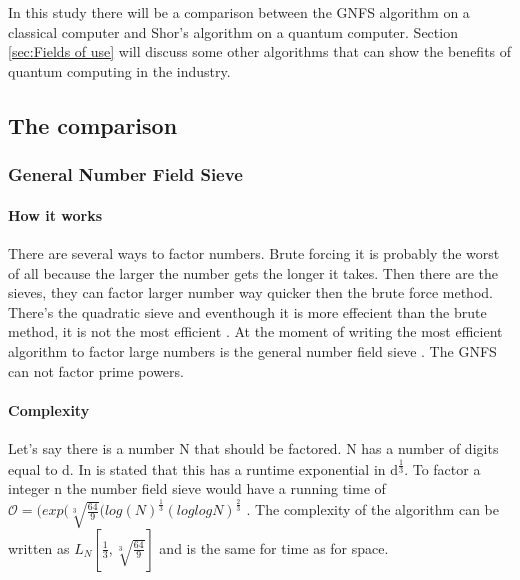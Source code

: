 
\chapter{}
\label{ch:onderzoek}



In this study there will be a comparison between the GNFS algorithm on a classical computer and Shor's algorithm on a quantum computer.
Section \ref{sec:Fields of use} will discuss some other algorithms that can show the benefits of quantum computing in the industry.
\section{The comparison}
\subsection{General Number Field Sieve}
\subsubsection{How it works}
There are several ways to factor numbers. Brute forcing it is probably the worst of all because the larger the number gets the longer it takes. Then there are the sieves, they can factor larger number way quicker then the brute force method.
There's the quadratic sieve and eventhough it is more effecient than the brute method, it is not the most efficient \autocite{Quadratic_sieve}. At the moment of writing the most efficient algorithm to factor large numbers is the general number field sieve \autocite{shor_algo}.
The GNFS can not factor prime powers.

\subsubsection{Complexity}
Let's say there is a number N that should be factored. N has a number of digits equal to d. In \textcite{shor_algo} is stated that this has a runtime exponential in d\textsuperscript{$\frac{1}{3}$}.
To factor a integer n the number field sieve would have a running time of $\mathcal{O} = (exp(\sqrt[3]{\frac{64}{9}}(log(N)^\frac{1}{3}(log log N)^\frac{2}{3}$ \autocite{nfscomp}.
The complexity of the algorithm can be written as $L_N[\frac{1}{3},\sqrt[3]{\frac{64}{9}}]$ and is the same for time as for space.
